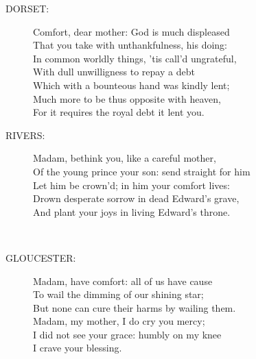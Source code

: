 \documentclass{article}
\begin{document}
\begin{description}
\item[DORSET:] 
\hspace{1pt}Comfort, dear mother: God is much displeased\\
\hspace{1pt}That you take with unthankfulness, his doing:\\
\hspace{1pt}In common worldly things, 'tis call'd ungrateful,\\
\hspace{1pt}With dull unwilligness to repay a debt\\
\hspace{1pt}Which with a bounteous hand was kindly lent;\\
\hspace{1pt}Much more to be thus opposite with heaven,\\
\hspace{1pt}For it requires the royal debt it lent you.\\
\end{description}
\begin{description}
\item[RIVERS:] 
\hspace{1pt}Madam, bethink you, like a careful mother,\\
\hspace{1pt}Of the young prince your son: send straight for him\\
\hspace{1pt}Let him be crown'd; in him your comfort lives:\\
\hspace{1pt}Drown desperate sorrow in dead Edward's grave,\\
\hspace{1pt}And plant your joys in living Edward's throne.\\
\end{description}
\\
\begin{description}
\item[GLOUCESTER:] 
\hspace{1pt}Madam, have comfort: all of us have cause\\
\hspace{1pt}To wail the dimming of our shining star;\\
\hspace{1pt}But none can cure their harms by wailing them.\\
\hspace{1pt}Madam, my mother, I do cry you mercy;\\
\hspace{1pt}I did not see your grace: humbly on my knee\\
\hspace{1pt}I crave your blessing.\\
\end{description}
\end{document}
